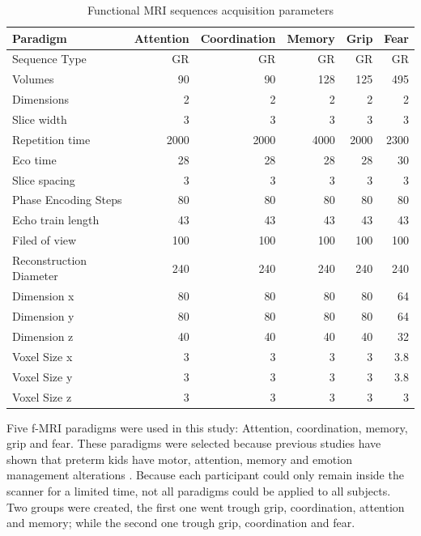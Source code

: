 \begin{table}
	\centering
	\footnotesize
		\begin{tabular}{l|rrrrr}

	Paradigm &Attention	&Coordination	&Memory	&Grip &Fear\\ \hline
	Sequence Type	&GR	&GR	&GR	&GR &GR\\
	Volumes	&90	&90	&128	&125 &495\\
	Dimensions	&2	&2	&2	&2 &2\\
	Slice width	&3	&3	&3	&3 &3\\ \hline
	Repetition time	&2000	&2000	&4000	&2000 &2300\\
	Eco time	&28	&28	&28	&28 &30\\
	Slice spacing	&3	&3	&3	&3 &3\\
	Phase Encoding Steps	&80	&80	&80	&80 &80\\
	Echo train length	&43	&43	&43	&43 &43\\
	Filed of view	&100	&100	&100	&100 &100\\
	Reconstruction	Diameter&240	&240	&240	&240 &240\\ \hline
	Dimension x &80	&80 &80 &80 &64 \\
	Dimension y &80	&80 &80 &80 &64 \\
	Dimension z &40	&40 &40 &40 &32 \\ \hline
	Voxel Size x	&3 &3 &3 &3 &3.8 \\
	Voxel Size y	&3 &3 &3 &3 &3.8 \\
	Voxel Size z	&3 &3 &3 &3 &3 \\
		\end{tabular}
	\caption{Functional MRI sequences acquisition parameters}
	\label{tab_fmri_params}
\end{table}

Five f-MRI paradigms were used in this study: Attention, coordination, memory, grip and fear. These paradigms were selected because previous studies have shown that preterm kids have motor, attention, memory and emotion management alterations \autocite{nosarti_neurodevelopmental_2010}. Because each participant could only remain inside the scanner for a limited time, not all paradigms could be applied to all subjects. Two groups were created, the first one went trough grip, coordination, attention and memory; while the second one trough grip, coordination and fear. 


